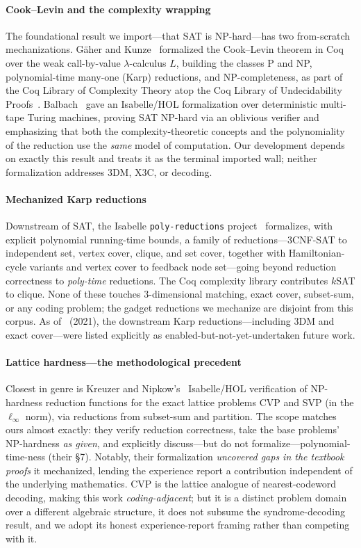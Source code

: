 \documentclass[sigplan,review,anonymous]{acmart}
\begin{document}
\paragraph{Cook--Levin and the complexity wrapping} The foundational result we import---that SAT is
NP-hard---has two from-scratch mechanizations. Gäher and Kunze~\cite{GK21} formalized the Cook--Levin theorem in
Coq over the weak call-by-value $\lambda$-calculus $L$, building the classes P and NP, polynomial-time many-one
(Karp) reductions, and NP-completeness, as part of the Coq Library of Complexity Theory atop the Coq Library of
Undecidability Proofs~\cite{CLUP}. Balbach~\cite{Bal23} gave an Isabelle/HOL formalization over deterministic
multi-tape Turing machines, proving SAT NP-hard via an oblivious verifier and emphasizing that both the
complexity-theoretic concepts and the polynomiality of the reduction use the \emph{same} model of computation.
Our development depends on exactly this result and treats it as the terminal imported wall; neither
formalization addresses 3DM, X3C, or decoding.

\paragraph{Mechanized Karp reductions} Downstream of SAT, the Isabelle \lstinline{poly-reductions}
project~\cite{PolyRed} formalizes, with explicit polynomial running-time bounds, a family of
reductions---3CNF-SAT to independent set, vertex cover, clique, and set cover, together with
Hamiltonian-cycle variants and vertex cover to feedback node set---going beyond reduction correctness to
\emph{poly-time} reductions. The Coq complexity library contributes $k$SAT to clique. None of these touches
3-dimensional matching, exact cover, subset-sum, or any coding problem; the gadget reductions we mechanize are
disjoint from this corpus. As of~\cite{GK21} (2021), the downstream Karp reductions---including 3DM and exact
cover---were listed explicitly as enabled-but-not-yet-undertaken future work.

\paragraph{Lattice hardness---the methodological precedent} Closest in genre is Kreuzer and
Nipkow's~\cite{KN23} Isabelle/HOL verification of NP-hardness reduction functions for the exact lattice problems
CVP and SVP (in the $\ell_\infty$ norm), via reductions from subset-sum and partition. The scope matches ours
almost exactly: they verify reduction correctness, take the base problems' NP-hardness \emph{as given}, and
explicitly discuss---but do not formalize---polynomial-time-ness (their \S7). Notably, their formalization
\emph{uncovered gaps in the textbook proofs} it mechanized, lending the experience report a contribution
independent of the underlying mathematics. CVP is the lattice analogue of nearest-codeword decoding, making
this work \emph{coding-adjacent}; but it is a distinct problem domain over a different algebraic structure, it
does not subsume the syndrome-decoding result, and we adopt its honest experience-report framing rather than
competing with it.
\end{document}
